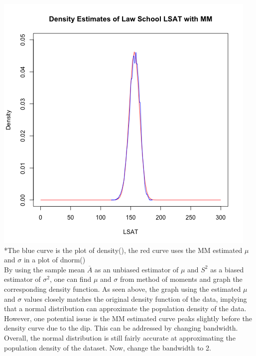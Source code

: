 \documentclass[12pt, letterpaper]{article}
\begin{document}
\includegraphics[scale=0.85]{Lawschool_LSAT_Density_mm} \\
\footnotesize
\**The blue curve is the plot of density(), the red curve uses the MM estimated $\mu$ and $\sigma$ in a plot of dnorm() \\
\normalsize
By using the sample mean $\overline{A}$ as an unbiased estimator of $\mu$ and $S^2$ as a biased estimator of $\sigma^2$, one can find $\mu$ and $\sigma$ from method of moments and graph the corresponding density function. As seen above, the graph using the estimated $\mu$ and $\sigma$ values closely matches the original density function of the data, implying that a normal distribution can approximate the population density of the data. However, one potential issue is the MM estimated curve peaks slightly before the density curve due to the dip. This can be addressed by changing bandwidth. Overall, the normal distribution is still fairly accurate at approximating the population density of the dataset. Now, change the bandwidth to 2.   \\
\end{document}
